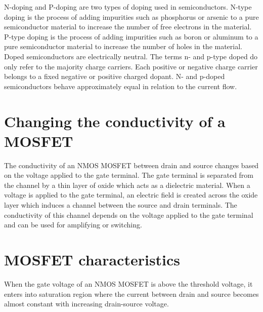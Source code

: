 \documentclass{article}
\begin{document}
N-doping and P-doping are two types of doping used in semiconductors.
N-type doping is the process of adding impurities such as phosphorus or arsenic
to a pure semiconductor material to increase the number of free electrons in the 
material. P-type doping is the process of adding impurities such as boron or aluminum 
to a pure semiconductor material to increase the number of holes in the material. Doped
semiconductors are electrically neutral. The terms n- and p-type doped do only refer to 
the majority charge carriers. Each positive or negative charge carrier belongs to a fixed
negative or positive charged dopant. N- and p-doped semiconductors behave approximately 
equal in relation to the current flow.

\section{Changing the conductivity of a MOSFET}

The conductivity of an NMOS MOSFET between drain and source changes based on the voltage
applied to the gate terminal. The gate terminal is separated from the channel by a thin
layer of oxide which acts as a dielectric material. When a voltage is applied to the
gate terminal, an electric field is created across the oxide layer which induces a 
channel between the source and drain terminals. The conductivity of this channel depends
on the voltage applied to the gate terminal and can be used for amplifying or switching.


\section{MOSFET characteristics}

When the gate voltage of an NMOS MOSFET is above the threshold voltage, it enters 
into saturation region where the current between drain and source becomes almost 
constant with increasing drain-source voltage.
\end{document}
